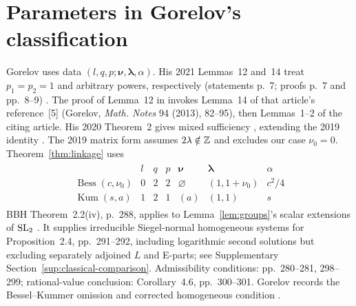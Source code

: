 \section{Parameters in Gorelov's classification}\label{app:gorelov}
Gorelov uses data $(l,q,p;\boldsymbol\nu,\boldsymbol\lambda,\alpha)$.
His 2021 Lemmas~12 and~14 treat $p_1=p_2=1$ and arbitrary powers,
respectively (statements p.~7; proofs p.~7 and \mbox{pp.}~8--9)
\cite[Lemmas~12 and~14]{Gorelov2021}.
The proof of Lemma~12 in \cite[p.~7]{Gorelov2021} invokes
Lemma~14 of that article's reference~[5] (Gorelov, \emph{Math. Notes}
94 (2013), 82--95), then Lemmas~1--2 of the citing article.
His 2020 Theorem~2 gives mixed sufficiency
\cite[p.~138]{Gorelov2020}, extending the 2019 identity
\cite[(3), p.~260]{Gorelov2019}. The 2019 matrix form
\cite[Theorem~1, p.~260]{Gorelov2019} assumes $2\lambda\notin\mathbb{Z}$
and excludes our case $\nu_0=0$.
Theorem~\ref{thm:linkage} uses
\begin{equation*}
\begin{gathered}
\begin{array}{c|ccc|c|c|c}
 &l&q&p&\boldsymbol\nu&\boldsymbol\lambda&\alpha\\ \hline
 \operatorname{Bess}(c,\nu_0)&0&2&2&\varnothing&(1,1+\nu_0)&c^2/4\\
 \operatorname{Kum}(s,a)&1&2&1&(a)&(1,1)&s
\end{array}
\end{gathered}
\end{equation*}
BBH Theorem~2.2(iv), p.~288, applies to Lemma~\ref{lem:groups}'s scalar
extensions of $\operatorname{SL}_2$ \cite{BBH1988}. It supplies irreducible Siegel-normal
homogeneous systems for Proposition~2.4, \mbox{pp.}~291--292, including logarithmic
second solutions but excluding separately adjoined $L$ and E-parts;
see Supplementary Section~\ref{sup:classical-comparison}. Admissibility conditions: \mbox{pp.}~280--281, 298--299;
rational-value conclusion: Corollary~4.6, \mbox{pp.}~300--301.
Gorelov records the Bessel--Kummer omission and corrected homogeneous condition
\cite[Example~1 and (9), p.~3; Lemma~14, \mbox{pp.}~7--9]{Gorelov2021}.

